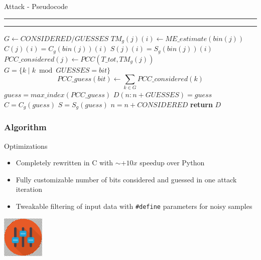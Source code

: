 \documentclass{beamer}
\begin{document}
\begin{frame}[allowframebreaks]{Attack - Pseudocode}
  \scriptsize
  \rule{\textwidth}{0.5pt}
  \vspace*{-0.5cm}
  \rule{\textwidth}{0.5pt}%
  \vspace*{0.2cm}
  \begin{center}
          \begin{algorithmic}[1]
              \State $G\gets CONSIDERED/GUESSES$
                    \State $TM_g(j)(i)\gets ME\_estimate(bin(j))$
                    \State $C(j)(i) = C_g(bin(j))(i)$
                    \State $S(j)(i) = S_g(bin(j))(i)$
                    \State
                  \EndFor
                \EndFor
                  \State $PCC\_considered(j)\gets PCC(T\_tot, TM_g(j))$
                \EndFor
                  \State $G = \{k \mid k \bmod GUESSES = bit\}$
                  \State $$PCC\_guess(bit)\gets \sum_{k \in G} PCC\_considered(k)$$
                \EndFor
                \State $guess = max\_index(PCC\_guess)$
                \State $D(n:n+GUESSES) = guess$
                \State $C = C_g(guess)$
                \State $S = S_g(guess)$
                \State $n = n + CONSIDERED$
              \EndWhile
              \State \textbf{return} $D$
            \EndProcedure
          \end{algorithmic}
  \end{center}
\end{frame}

\begin{frame}[fragile]
    \frametitle{Algorithm}
    \begin{block}{Optimizations}
        \begin{itemize}
            \pause \item Completely rewritten in C with $\sim +10x$ speedup over Python
            \pause \item Fully customizable number of bits considered and guessed in one attack iteration
            \pause \item Tweakable filtering of input data with \texttt{\#define} parameters for noisy samples
        \end{itemize}
    \end{block}
    \hfill \includegraphics[width=2cm]{./graphics/tweak}
\end{frame}
\end{document}
